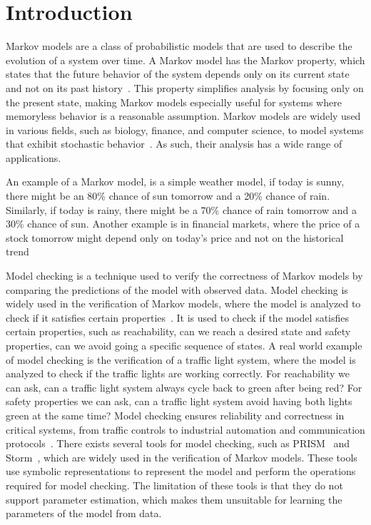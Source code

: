 \section{Introduction}\label{sec:introduction}
Markov models are a class of probabilistic models that are used to describe the evolution of a system over time. 
A Markov model has the Markov property, which states that the future behavior of the system depends only on its current state and not on its past history~\cite{markov1962theory}.
This property simplifies analysis by focusing only on the present state, making Markov models especially useful for systems where memoryless behavior is a reasonable assumption.
Markov models are widely used in various fields, such as biology, finance, and computer science, to model systems that exhibit stochastic behavior~\cite{covid19_prism,ciocchetta2009bio, mamon2007hidden,lazowska1984quantitative}.
As such, their analysis has a wide range of applications.

An example of a Markov model, is a simple weather model, if today is sunny, there might be an 80\% chance of sun tomorrow and a 20\% chance of rain. Similarly, if today is rainy, there might be a 70\% chance of rain tomorrow and a 30\% chance of sun.
Another example is in financial markets, where the price of a stock tomorrow might depend only on today's price and not on the historical trend

Model checking is a technique used to verify the correctness of Markov models by comparing the predictions of the model with observed data.
Model checking is widely used in the verification of Markov models, where the model is analyzed to check if it satisfies certain properties~\cite{clarke1997model}. 
It is used to check if the model satisfies certain properties, such as reachability, can we reach a desired state and safety properties, can we avoid going a specific sequence of states.
A real world example of model checking is the verification of a traffic light system, where the model is analyzed to check if the traffic lights are working correctly.
For reachability we can ask, can a traffic light system always cycle back to green after being red?
For safety properties we can ask, can a traffic light system avoid having both lights green at the same time?
Model checking ensures reliability and correctness in critical systems, from traffic controls to industrial automation and communication protocols~\cite{clarke1997model}.
There exists several tools for model checking, such as PRISM~\cite{kwiatkowska2011prism} and Storm~\cite{hensel2021probabilistic}, which are widely used in the verification of Markov models. 
These tools use symbolic representations to represent the model and perform the operations required for model checking.
The limitation of these tools is that they do not support parameter estimation, which makes them unsuitable for learning the parameters of the model from data.

